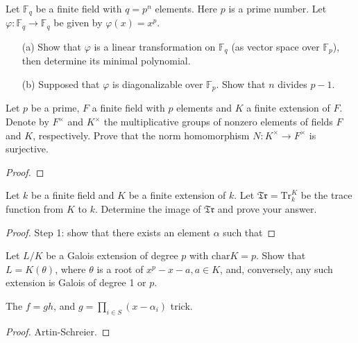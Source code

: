 \begin{prob}[F2010-Q5]
    Let \(\mathbb{F}_q\) be a finite field with \(q = p^n\) elements. Here \(p\) is a prime number. Let \(\varphi : \mathbb{F}_q \rightarrow \mathbb{F}_q\) be given by \(\varphi(x) = x^p\).
    \begin{itemize}
        \item[(a)] Show that \(\varphi\) is a linear transformation on \(\mathbb{F}_q\) (as vector space over \(\mathbb{F}_p\)), then determine its minimal polynomial.
        \item[(b)] Supposed that \(\varphi\) is diagonalizable over \(\mathbb{F}_p\). Show that \(n\) divides \(p - 1\).
    \end{itemize}
\end{prob}






\begin{prob}[S2011-Q2]
    Let \(p\) be a prime, \(F\) a finite field with \(p\) elements and \(K\) a finite extension of \(F\). Denote by \(F^\times\) and \(K^\times\) the multiplicative groups of nonzero elements of fields \(F\) and \(K\), respectively. Prove that the norm homomorphism \(N:K^\times\to F^\times\) is surjective.
\end{prob}
\begin{proof}

\end{proof}



\begin{prob}[F2008-Q3]
    Let \(k\) be a finite field and \(K\) be a finite extension of \(k\). Let \(\mathfrak{Tr} = \text{Tr}_k^K\) be the trace function from \(K\) to \(k\). Determine the image of \(\mathfrak{Tr}\) and prove your answer.
\end{prob}
\begin{proof}
    Step 1: show that there exists an element $\alpha$ such that 
\end{proof}



\begin{prob}[S2014-Q3]
    Let \(L/K\) be a Galois extension of degree \(p\) with \(\text{char}K=p\). Show that \(L=K(\theta)\), where \(\theta\) is a root of \(x^{p}-x-a,a\in K\), and, conversely, any such extension is Galois of degree 1 or \(p\).
\end{prob}
\begin{warn}
    The $f=gh$, and $g=\prod_{i\in S}(x-\alpha_i)$ trick.
\end{warn}
\begin{proof}
    Artin-Schreier.
\end{proof}


